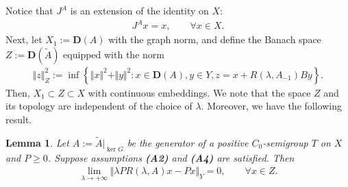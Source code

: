 \documentclass[onecolumn]{autart}
\def\la{\lambda}
\newtheorem{lemma}{Lemma}[section]
\numberwithin{equation}{section}
\begin{document}
	Notice that $J^A$ is an extension of the identity on $X$:
	\begin{align}\label{Tool}
		J^Ax=x,\qquad \forall x\in X.
	\end{align}
    Next, let $X_1 := {\bm D}(A)$ with the graph norm, and define the Banach space $Z := {\bm D}(\tilde{A})$ equipped with the norm
	\begin{align*}
		\Vert z\Vert_{Z}^2:=\inf\left\{\Vert x\Vert^2+\Vert y\Vert^2:
		x\in {\bm D}(A),y\in Y,z=x+R(\la,A_{-1}) B y \right\}.
	\end{align*}
	Then, $X_1\subset Z\subset X$ with continuous embeddings.  We note that the space $Z$ and its topology are independent of the choice of $\la$. Moreover, we have the following result.
	\begin{lemma}\label{P-regularity}
		Let $A := \tilde{A}|_{\ker G}$ be the generator of a positive $C_0$-semigroup $T$ on $X$ and $P \ge 0$. Suppose assumptions {\bf (A2)} and {\bf (A4)} are satisfied. Then
		\begin{align}\label{Limit-Px}
			\lim_{\la \to +\infty} \Vert \la P R(\la,A)x-Px\Vert_Y=0, \qquad \forall x\in Z.
		\end{align}
	\end{lemma}
\end{document}
